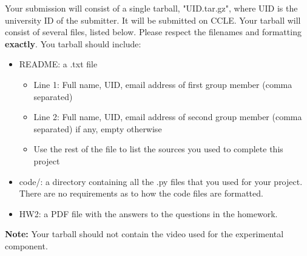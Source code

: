 \documentclass[answers]{exam}
\begin{document}
Your submission will consist of a single tarball, "UID.tar.gz", where UID is the university ID of the submitter. It will be submitted on CCLE. Your tarball will consist of several files, listed below. Please respect the filenames and formatting \textbf{exactly}. You tarball should include:
\begin{itemize}
    \item README: a .txt file
        \begin{itemize}
            \item Line 1: Full name, UID, email address of first group member (comma separated)
            \item Line 2: Full name, UID, email address of second group member (comma separated) if any, empty otherwise
            \item Use the rest of the file to list the sources you used to complete this project
        \end{itemize}
    \item code/: a directory containing all the .py files that you used for your project. There are no requirements as to how the code files are formatted.
    \item HW2: a PDF file with the answers to the questions in the homework.
\end{itemize}

\textbf{Note:} Your tarball should not contain the video used for the experimental component.




\end{document}
